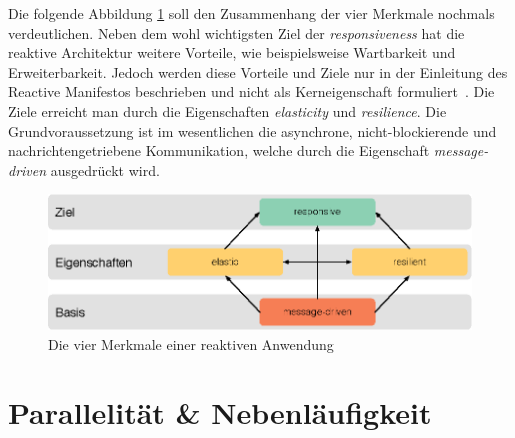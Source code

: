Die folgende Abbildung \ref{fig:four-traits} soll den Zusammenhang der vier Merkmale nochmals verdeutlichen. Neben dem wohl wichtigsten Ziel der \textit{responsiveness} hat die reaktive Architektur weitere Vorteile, wie beispielsweise Wartbarkeit und Erweiterbarkeit. Jedoch werden diese Vorteile und Ziele nur in der Einleitung des Reactive Manifestos beschrieben und nicht als Kerneigenschaft formuliert~\cite{boner_reactive_2014}. Die Ziele erreicht man durch die Eigenschaften \textit{elasticity} und \textit{resilience}. Die Grundvoraussetzung ist im wesentlichen die asynchrone, nicht-blockierende und nachrichtengetriebene Kommunikation, welche durch die Eigenschaft \textit{message-driven} ausgedrückt wird.

\begin{figure}[H]
 \centering
 \includegraphics[width=1.0\textwidth]{3-Grundlagen/four-traits/four-traits.eps}
 \caption{Die vier Merkmale einer reaktiven Anwendung \cite{kuhn_code_2015}}
 \label{fig:four-traits}
\end{figure}

\pagebreak

\section{Parallelität \& Nebenläufigkeit}

